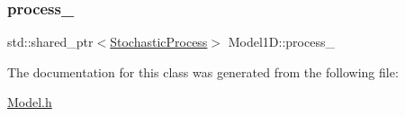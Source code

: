 \subsubsection{\texorpdfstring{process\+\_\+}{process\_}}
{\footnotesize\ttfamily std\+::shared\+\_\+ptr$<$\hyperlink{class_stochastic_process}{Stochastic\+Process}$>$ Model1\+D\+::process\+\_\+\hspace{0.3cm}{\ttfamily [protected]}}



The documentation for this class was generated from the following file\+:\begin{DoxyCompactItemize}
\item 
\hyperlink{_model_8h}{Model.\+h}\end{DoxyCompactItemize}
